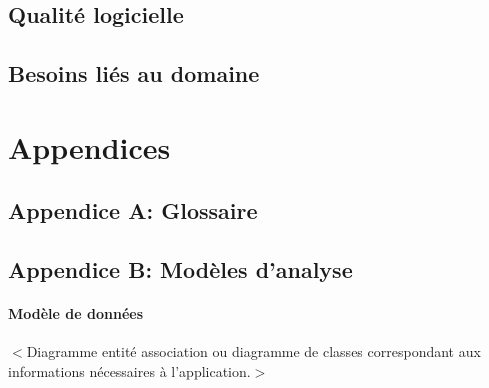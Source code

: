 \documentclass{scrreprt}
\begin{document}
\section{Qualité logicielle}

\section{Besoins liés au domaine}




\chapter{Appendices}
\section{Appendice A: Glossaire}
\printglossaries

\section{Appendice B: Modèles d'analyse}

\subsubsection{Modèle de données}
$<$Diagramme entité association ou diagramme de classes correspondant aux informations nécessaires à l'application.$>$





\end{document}
